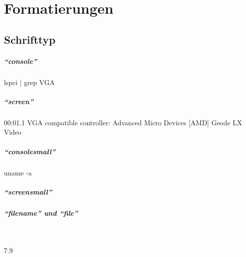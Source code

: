 \chapter{Formatierungen}

\section{Schrifttyp}

\paragraph{"`console"'}

\begin{console}
lspci | grep VGA
\end{console}


\paragraph{"`screen"'}

\begin{screen}
00:01.1 VGA compatible controller: Advanced Micro Devices [AMD] Geode LX Video
\end{screen}

\paragraph{"`consolesmall"'}

\begin{consolesmall}
uname -a
\end{consolesmall}

\paragraph{"`screensmall"'}


\paragraph{"`filename"' und "`file"'}~\\

\begin{file}
7.9
\end{file}

